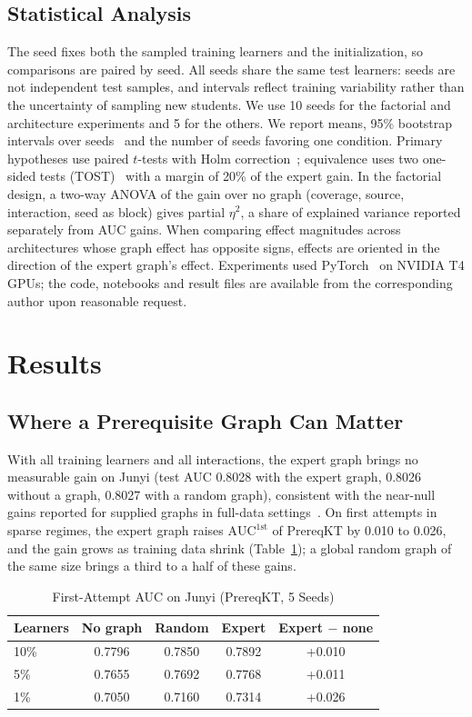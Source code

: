 \documentclass[lettersize,journal]{IEEEtran}
\newcommand{\aucfa}{\mathrm{AUC}^{\mathrm{1st}}}
\begin{document}
\subsection{Statistical Analysis}
The seed fixes both the sampled training learners and the initialization, so comparisons are paired by seed. All seeds share the same test learners: seeds are not independent test samples, and intervals reflect training variability rather than the uncertainty of sampling new students. We use 10 seeds for the factorial and architecture experiments and 5 for the others. We report means, 95\% bootstrap intervals over seeds~\cite{efron1993introduction} and the number of seeds favoring one condition. Primary hypotheses use paired $t$-tests with Holm correction~\cite{holm1979simple}; equivalence uses two one-sided tests (TOST)~\cite{schuirmann1987comparison,lakens2017equivalence} with a margin of 20\% of the expert gain. In the factorial design, a two-way ANOVA of the gain over no graph (coverage, source, interaction, seed as block) gives partial $\eta^2$, a share of explained variance reported separately from AUC gains. When comparing effect magnitudes across architectures whose graph effect has opposite signs, effects are oriented in the direction of the expert graph's effect. Experiments used PyTorch~\cite{paszke2019pytorch} on NVIDIA T4 GPUs; the code, notebooks and result files are available from the corresponding author upon reasonable request.

\section{Results}
\subsection{Where a Prerequisite Graph Can Matter}
With all training learners and all interactions, the expert graph brings no measurable gain on Junyi (test AUC 0.8028 with the expert graph, 0.8026 without a graph, 0.8027 with a random graph), consistent with the near-null gains reported for supplied graphs in full-data settings~\cite{truong2026replication}. On first attempts in sparse regimes, the expert graph raises $\aucfa$ of PrereqKT by 0.010 to 0.026, and the gain grows as training data shrink (Table~\ref{tab:sparse}); a global random graph of the same size brings a third to a half of these gains.

\begin{table}[t]
\centering
\caption{First-Attempt AUC on Junyi (PrereqKT, 5 Seeds)}
\label{tab:sparse}
\footnotesize
\setlength{\tabcolsep}{3.5pt}
\begin{tabular}{@{}lcccc@{}}
\toprule
Learners & No graph & Random & Expert & Expert $-$ none \\
\midrule
10\% & 0.7796 & 0.7850 & 0.7892 & +0.010 \\
5\% & 0.7655 & 0.7692 & 0.7768 & +0.011 \\
1\% & 0.7050 & 0.7160 & 0.7314 & +0.026 \\
\bottomrule
\end{tabular}
\end{table}
\end{document}
